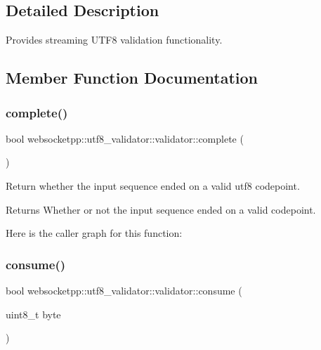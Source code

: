 \subsection{Detailed Description}
Provides streaming U\+T\+F8 validation functionality. 

\subsection{Member Function Documentation}
\mbox{\label{classwebsocketpp_1_1utf8__validator_1_1validator_a89deb3bdfd8b94da908b806e543491ba}} 
\subsubsection{\texorpdfstring{complete()}{complete()}}
{\footnotesize\ttfamily bool websocketpp\+::utf8\+\_\+validator\+::validator\+::complete (\begin{DoxyParamCaption}{ }\end{DoxyParamCaption})\hspace{0.3cm}{\ttfamily [inline]}}



Return whether the input sequence ended on a valid utf8 codepoint. 

\begin{DoxyReturn}{Returns}
Whether or not the input sequence ended on a valid codepoint. 
\end{DoxyReturn}
Here is the caller graph for this function\+:
\mbox{\label{classwebsocketpp_1_1utf8__validator_1_1validator_ada7f6cdd4261d848d51d7ba0bd9d28b4}} 
\subsubsection{\texorpdfstring{consume()}{consume()}}
{\footnotesize\ttfamily bool websocketpp\+::utf8\+\_\+validator\+::validator\+::consume (\begin{DoxyParamCaption}\item[{uint8\+\_\+t}]{byte }\end{DoxyParamCaption})\hspace{0.3cm}{\ttfamily [inline]}}



